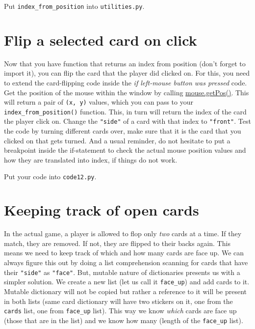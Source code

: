 \documentclass[
]{book}
\begin{document}
Put \texttt{index\_from\_position} into \texttt{utilities.py}.

\hypertarget{flip-a-selected-card-on-click}{%
\section{Flip a selected card on click}\label{flip-a-selected-card-on-click}}

Now that you have function that returns an index from position (don't forget to import it), you can flip the card that the player did clicked on. For this, you need to extend the card-flipping code inside the \emph{if left-mouse button was pressed} code. Get the position of the mouse within the window by calling \href{https://psychopy.org/api/event.html\#psychopy.event.Mouse.getPos}{mouse.getPos()}. This will return a pair of \texttt{(x,\ y)} values, which you can pass to your \texttt{index\_from\_position()} function. This, in turn will return the index of the card the player click on. Change the \texttt{"side"} of a card with that index to \texttt{"front"}. Test the code by turning different cards over, make sure that it is the card that you clicked on that gets turned. And a usual reminder, do not hesitate to put a breakpoint inside the if-statement to check the actual mouse position values and how they are translated into index, if things do not work.

Put your code into \texttt{code12.py}.

\hypertarget{keeping-track-of-open-cards}{%
\section{Keeping track of open cards}\label{keeping-track-of-open-cards}}

In the actual game, a player is allowed to flop only \emph{two} cards at a time. If they match, they are removed. If not, they are flipped to their backs again. This means we need to keep track of which and how many cards are face up. We can always figure this out by doing a list comprehension scanning for cards that have their \texttt{"side"} as \texttt{"face"}. But, mutable nature of dictionaries presents us with a simpler solution. We create a new list (let us call it \texttt{face\_up}) and add cards to it. Mutable dictionary will not be copied but rather a reference to it will be present in both lists (same card dictionary will have two stickers on it, one from the \texttt{cards} list, one from \texttt{face\_up} list). This way we know \emph{which} cards are face up (those that are in the list) and we know how many (length of the \texttt{face\_up} list).
\end{document}

